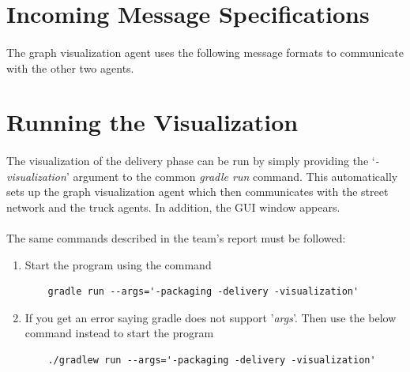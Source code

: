 \documentclass[11pt, a4paper]{article}
\begin{document}
\section{Incoming Message Specifications}\label{MessageSpecifications}
\paragraph{}
The graph visualization agent uses the following message formats to communicate with the other two agents.


\pagebreak

\section{Running the Visualization}
\paragraph{}
The visualization of the delivery phase can be run by simply providing the `\textit{-visualization}' argument to the common \textit{gradle run} command. This automatically sets up the graph visualization agent which then communicates with the street network and the truck agents. In addition, the GUI window appears.

\paragraph{}
The same commands described in the team's report must be followed:
\begin{enumerate} 
	\item Start the program using the command
	\begin{verbatim}
	gradle run --args='-packaging -delivery -visualization'
	\end{verbatim}
	\item If you get an error saying gradle does not support '\textit{args}'. Then use the below command instead to start the program
	\begin{verbatim}
	./gradlew run --args='-packaging -delivery -visualization'
	\end{verbatim}
\end{enumerate}
\end{document}
